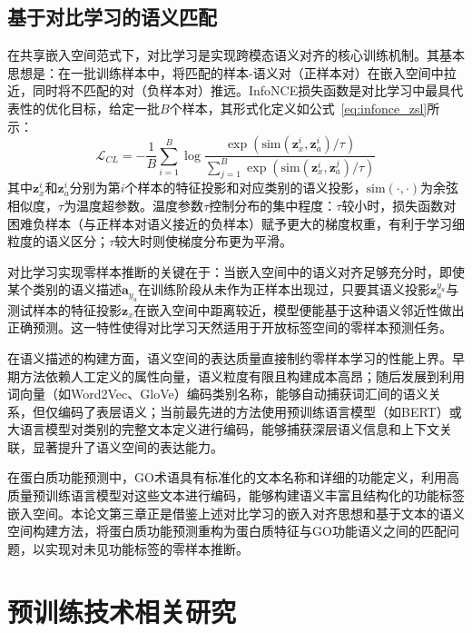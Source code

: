 \subsection{基于对比学习的语义匹配}

在共享嵌入空间范式下，对比学习是实现跨模态语义对齐的核心训练机制。其基本思想是：在一批训练样本中，将匹配的样本-语义对（正样本对）在嵌入空间中拉近，同时将不匹配的对（负样本对）推远。InfoNCE\cite{oord2018representation}损失函数是对比学习中最具代表性的优化目标，给定一批$B$个样本，其形式化定义如公式~\eqref{eq:infonce_zsl}所示：
\begin{equation}
\label{eq:infonce_zsl}
\mathcal{L}_{CL} = -\frac{1}{B}\sum_{i=1}^{B}\log\frac{\exp(\text{sim}(\mathbf{z}_x^i, \mathbf{z}_a^i)/\tau)}{\sum_{j=1}^{B}\exp(\text{sim}(\mathbf{z}_x^i, \mathbf{z}_a^j)/\tau)}
\end{equation}
其中$\mathbf{z}_x^i$和$\mathbf{z}_a^i$分别为第$i$个样本的特征投影和对应类别的语义投影，$\text{sim}(\cdot, \cdot)$为余弦相似度，$\tau$为温度超参数。温度参数$\tau$控制分布的集中程度：$\tau$较小时，损失函数对困难负样本（与正样本对语义接近的负样本）赋予更大的梯度权重，有利于学习细粒度的语义区分；$\tau$较大时则使梯度分布更为平滑。

对比学习实现零样本推断的关键在于：当嵌入空间中的语义对齐足够充分时，即使某个类别的语义描述$\mathbf{a}_{y_u}$在训练阶段从未作为正样本出现过，只要其语义投影$\mathbf{z}_{a}^{y_u}$与测试样本的特征投影$\mathbf{z}_{x}$在嵌入空间中距离较近，模型便能基于这种语义邻近性做出正确预测。这一特性使得对比学习天然适用于开放标签空间的零样本预测任务。

在语义描述的构建方面，语义空间的表达质量直接制约零样本学习的性能上界。早期方法依赖人工定义的属性向量\cite{lampert2014attribute}，语义粒度有限且构建成本高昂；随后发展到利用词向量（如Word2Vec\cite{mikolov2013efficient}、GloVe\cite{pennington2014glove}）编码类别名称，能够自动捕获词汇间的语义关系，但仅编码了表层语义；当前最先进的方法使用预训练语言模型（如BERT\cite{devlin2019bert}）或大语言模型对类别的完整文本定义进行编码，能够捕获深层语义信息和上下文关联，显著提升了语义空间的表达能力。

在蛋白质功能预测中，GO术语具有标准化的文本名称和详细的功能定义，利用高质量预训练语言模型对这些文本进行编码，能够构建语义丰富且结构化的功能标签嵌入空间。本论文第三章正是借鉴上述对比学习的嵌入对齐思想和基于文本的语义空间构建方法，将蛋白质功能预测重构为蛋白质特征与GO功能语义之间的匹配问题，以实现对未见功能标签的零样本推断。

\section{预训练技术相关研究}

